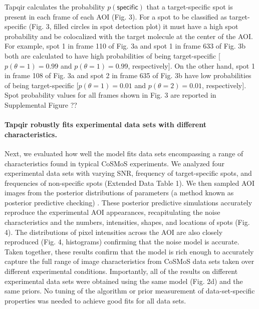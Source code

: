 Tapqir calculates the probability $p(\mathsf{specific})$ that a target-specific spot is present in each frame of each AOI (Fig. 3).  For a spot to be classified as target-specific (Fig. 3, filled circles in spot detection plot) it must have a high spot probability and be colocalized with the target molecule at the center of the AOI. For example, spot 1 in frame 110 of Fig. 3a and spot 1 in frame 633 of Fig. 3b both are calculated to have high probabilities of being target-specific [$p(\theta=1) = 0.99$ and $p(\theta=1) = 0.99$, respectively]. On the other hand, spot 1 in frame 108 of Fig. 3a and spot 2 in frame 635 of Fig. 3b have low probabilities of being target-specific [$p(\theta=1) = 0.01$ and $p(\theta=2) = 0.01$, respectively]. Spot probability values for all frames shown in Fig. 3 are reported in Supplemental Figure ??  

\paragraph{Tapqir robustly fits experimental data sets with different characteristics.}
Next, we evaluated how well the model fits data sets encompassing a range of characteristics found in typical CoSMoS experiments. We analyzed four experimental data sets with varying SNR, frequency of target-specific spots, and frequencies of non-specific spots (Extended Data Table 1). We then sampled AOI images from the posterior distributions of parameters (a method known as posterior predictive checking) \cite{Gelman_undated-ro}. These posterior predictive simulations accurately reproduce the experimental AOI appearances, recapitulating the noise characteristics and the numbers, intensities, shapes, and locations of spots (Fig. 4).  The distributions of pixel intensities across the AOI are also closely reproduced (Fig. 4, histograms) confirming that the noise model is accurate. Taken together, these results confirm that the model is rich enough to accurately capture the full range of image characteristics from CoSMoS data sets taken over different experimental conditions.  Importantly, all of the results on different experimental data sets were obtained using the same model (Fig. 2d) and the same priors.  No tuning of the algorithm or prior measurement of data-set-specific properties was needed to achieve good fits for all data sets.


